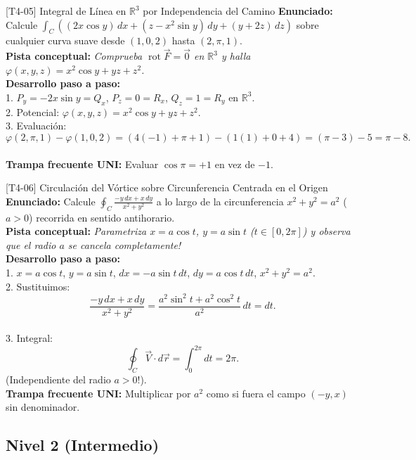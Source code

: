 \documentclass[11pt,a4paper]{article}
\begin{document}
\begin{ejerciciobox}{[T4-05] Integral de Línea en $\mathbb{R}^3$ por Independencia del Camino}
\textbf{Enunciado:} Calcule $\int_C \left((2x\cos y)\,dx + (z - x^2\sin y)\,dy + (y + 2z)\,dz\right)$ sobre cualquier curva suave desde $(1,0,2)$ hasta $(2,\pi,1)$.\\[0.2cm]
\textbf{Pista conceptual:} \emph{Comprueba $\operatorname{rot}\vec{F} = \vec{0}$ en $\mathbb{R}^3$ y halla $\varphi(x,y,z) = x^2\cos y + yz + z^2$.}\\[0.2cm]
\textbf{Desarrollo paso a paso:}\\
1. $P_y = -2x\sin y = Q_x$, $P_z = 0 = R_x$, $Q_z = 1 = R_y$ en $\mathbb{R}^3$.\\
2. Potencial: $\varphi(x,y,z) = x^2\cos y + yz + z^2$.\\
3. Evaluación:\\
$$\varphi(2,\pi,1) - \varphi(1,0,2) = (4(-1) + \pi + 1) - (1(1) + 0 + 4) = (\pi - 3) - 5 = \pi - 8.$$\\[0.2cm]
\textbf{Trampa frecuente UNI:} Evaluar $\cos\pi = +1$ en vez de $-1$.
\end{ejerciciobox}

\begin{ejerciciobox}{[T4-06] Circulación del Vórtice sobre Circunferencia Centrada en el Origen}
\textbf{Enunciado:} Calcule $\oint_C \frac{-y\,dx + x\,dy}{x^2 + y^2}$ a lo largo de la circunferencia $x^2 + y^2 = a^2$ ($a > 0$) recorrida en sentido antihorario.\\[0.2cm]
\textbf{Pista conceptual:} \emph{Parametriza $x = a\cos t$, $y = a\sin t$ ($t \in [0, 2\pi]$) y observa que el radio $a$ se cancela completamente!}\\[0.2cm]
\textbf{Desarrollo paso a paso:}\\
1. $x = a\cos t$, $y = a\sin t$, $dx = -a\sin t\,dt$, $dy = a\cos t\,dt$, $x^2+y^2 = a^2$.\\
2. Sustituimos:\\
$$\frac{-y\,dx + x\,dy}{x^2+y^2} = \frac{a^2\sin^2 t + a^2\cos^2 t}{a^2}\,dt = dt.$$\\
3. Integral:\\
$$\oint_C \vec{V}\cdot d\vec{r} = \int_0^{2\pi} dt = 2\pi.$$ (Independiente del radio $a > 0$!).\\[0.2cm]
\textbf{Trampa frecuente UNI:} Multiplicar por $a^2$ como si fuera el campo $(-y, x)$ sin denominador.
\end{ejerciciobox}

\subsection{Nivel 2 (Intermedio)}
\end{document}
